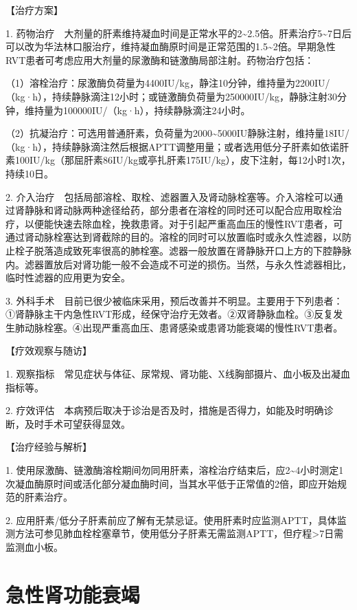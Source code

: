 【治疗方案】

1.
药物治疗　大剂量的肝素维持凝血时间是正常水平的2\textasciitilde{}2.5倍。肝素治疗5\textasciitilde{}7日后可以改为华法林口服治疗，维持凝血酶原时间是正常范围的1.5\textasciitilde{}2倍。早期急性RVT患者可考虑应用大剂量的尿激酶和链激酶局部注射。药物治疗包括：

（1）溶栓治疗：尿激酶负荷量为4400IU/kg，静注10分钟，维持量为2200IU/（kg·h），持续静脉滴注12小时；或链激酶负荷量为250000IU/kg，静脉注射30分钟，维持量为100000IU/（kg·h），持续静脉滴注24小时。

（2）抗凝治疗：可选用普通肝素，负荷量为2000\textasciitilde{}5000IU静脉注射，维持量18IU/（kg·h），持续静脉滴注然后根据APTT调整用量；或者选用低分子肝素如依诺肝素100IU/kg（那屈肝素86IU/kg或亭扎肝素175IU/kg），皮下注射，每12小时1次，持续10日。

2.
介入治疗　包括局部溶栓、取栓、滤器置入及肾动脉栓塞等。介入溶栓可以通过肾静脉和肾动脉两种途径给药，部分患者在溶栓的同时还可以配合应用取栓治疗，以便能快速去除血栓，挽救患肾。对于引起严重高血压的慢性RVT患者，可通过肾动脉栓塞达到肾截除的目的。溶栓的同时可以放置临时或永久性滤器，以防止栓子脱落造成致死率很高的肺栓塞。滤器一般放置在肾静脉开口上方的下腔静脉内。滤器置放后对肾功能一般不会造成不可逆的损伤。当然，与永久性滤器相比，临时性滤器的应用更为安全。

3.
外科手术　目前已很少被临床采用，预后改善并不明显。主要用于下列患者：①肾静脉主干内急性RVT形成，经保守治疗无效者。②双肾静脉血栓。③反复发生肺动脉栓塞。④出现严重高血压、患肾感染或患肾功能衰竭的慢性RVT患者。

【疗效观察与随访】

1.
观察指标　常见症状与体征、尿常规、肾功能、X线胸部摄片、血小板及出凝血指标等。

2.
疗效评估　本病预后取决于诊治是否及时，措施是否得力，如能及时明确诊断，及时手术可望获得显效。

【治疗经验与解析】

1.
使用尿激酶、链激酶溶栓期间勿同用肝素，溶栓治疗结束后，应2\textasciitilde{}4小时测定1次凝血酶原时间或活化部分凝血酶时间，当其水平低于正常值的2倍，即应开始规范的肝素治疗。

2.
应用肝素/低分子肝素前应了解有无禁忌证。使用肝素时应监测APTT，具体监测方法可参见肺血栓栓塞章节，使用低分子肝素无需监测APTT，但疗程\textgreater{}7日需监测血小板。

\section{急性肾功能衰竭}

